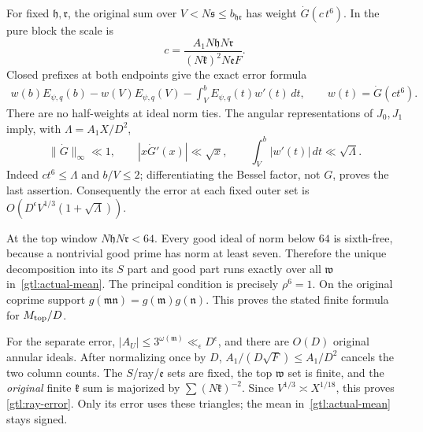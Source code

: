 For fixed $\mathfrak h,\mathfrak r$, the original sum over
$V<N\mathfrak s\le b_{\mathfrak h\mathfrak r}$ has weight
$\dot G(c\,t^6)$. In the pure block the scale is
\begin{equation}\label{gtl:Stieltjes-scale}
 c=\frac{A_1N\mathfrak hN\mathfrak r}
              {(N\mathfrak k)^2N\mathfrak e F}.
\end{equation}
Closed prefixes at both endpoints give the exact error formula
\begin{equation}\label{gtl:Stieltjes-error}
 \begin{split}
 w(b)E_{\psi,q}(b)-w(V)E_{\psi,q}(V)
             -\int_V^b E_{\psi,q}(t)w'(t)\,dt,
 \qquad w(t)=\dot G(ct^6).
 \end{split}
\end{equation}
There are no half-weights at ideal norm ties. The angular
representations of $J_0,J_1$ imply, with
$\Lambda=A_1X/D^2$,
\begin{equation}\label{gtl:Bessel-variation}
 \|\dot G\|_\infty\ll1,\qquad
 |x\dot G'(x)|\ll\sqrt x,\qquad
 \int_V^b|w'(t)|\,dt\ll\sqrt\Lambda .
\end{equation}
Indeed $ct^6\le\Lambda$ and $b/V\le2$; differentiating
the Bessel factor, not $G$, proves the last assertion.
Consequently the error at each fixed outer set is
$O(D^\epsilon V^{1/3}(1+\sqrt\Lambda))$.

At the top window $N\mathfrak hN\mathfrak r<64$.
Every good ideal of norm below $64$ is sixth-free, because
a nontrivial good prime has norm at least seven. Therefore
the unique decomposition into its $S$ part and good part
runs exactly over all $\mathfrak w$ in~\eqref{gtl:actual-mean}.
The principal condition is precisely $\rho^6=1$.
On the original coprime support
$g(\mathfrak m\mathfrak n)=g(\mathfrak m)g(\mathfrak n)$.
This proves the stated finite formula for $M_{\rm top}/D$.

For the separate error, $|A_U|\le3^{\omega(\mathfrak m)}
\ll_\epsilon D^\epsilon$, and there are $O(D)$ original
annular ideals. After normalizing once by $D$,
$A_1/(D\sqrt F)\le A_1/D^2$ cancels the two column counts.
The $S$/ray/$\mathfrak e$ sets are fixed, the top
$\mathfrak w$ set is finite, and the \emph{original} finite
$\mathfrak k$ sum is majorized by $\sum(N\mathfrak k)^{-2}$.
Since $V^{1/3}\asymp X^{1/18}$, this proves
\eqref{gtl:ray-error}. Only its error uses these triangles;
the mean in~\eqref{gtl:actual-mean} stays signed.

